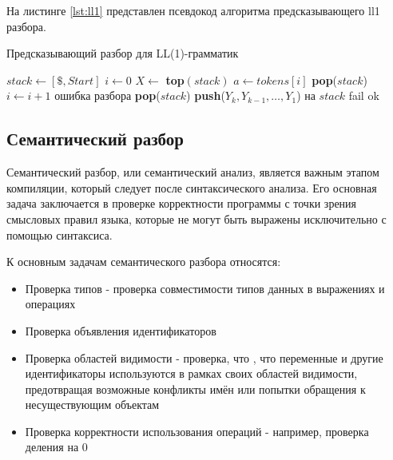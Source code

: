 \documentclass[14pt, russian]{scrartcl}
\begin{document}
На листинге \ref{lst:ll1} представлен псевдокод алгоритма предсказывающего ll1 разбора.

\begin{listing}
	\caption{Предсказывающий разбор для LL(1)-грамматик}
	\label{lst:ll1}
\begin{algorithm}[H]
	\begin{algorithmic}[1]
	  \State $stack \gets [\$, Start]$ 
	  \State $i \gets 0$
		\State $X \gets$ \textbf{top}$(stack)$
		\State $a \gets tokens[i]$
			 \State \textbf{pop}($stack$)
			 \State $i \gets i + 1$
		  \Else
			 \State \Return ошибка разбора
		  \EndIf
		\Else
			 \State \textbf{pop}($stack$)
			 \State \textbf{push}($Y_k, Y_{k-1}, \dots, Y_1$) на $stack$
		  \Else
			 \State \Return fail
		  \EndIf
		\EndIf
	  \EndWhile
	  \State \Return ok
	\EndProcedure
	\end{algorithmic}
\end{algorithm}
\end{listing}

\subsection{Семантический разбор}

Семантический разбор, или семантический анализ, является важным этапом компиляции, который следует
после синтаксического анализа. Его основная задача заключается в проверке корректности программы с
точки зрения смысловых правил языка, которые не могут быть выражены исключительно с помощью синтаксиса.

К основным задачам семантического разбора относятся:

\begin{itemize}
	\item Проверка типов - проверка совместимости типов данных в выражениях и операциях
	\item Проверка объявления идентификаторов
	\item Проверка областей видимости - проверка, что , что переменные и другие идентификаторы используются в
	рамках своих областей видимости, предотвращая возможные конфликты имён или попытки обращения к
	несуществующим объектам
	\item Проверка корректности использования операций - например, проверка деления на 0
\end{itemize}
\end{document}
